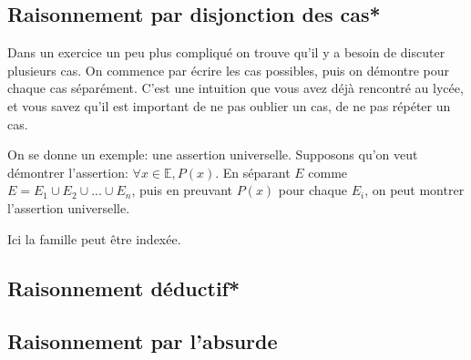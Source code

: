 \documentclass{article}
\begin{document}
\subsection{Raisonnement par disjonction des cas*}

Dans un exercice un peu plus compliqué on trouve qu'il y a besoin de discuter plusieurs cas. On commence par écrire les cas possibles, puis on démontre pour chaque cas séparément. C'est une intuition que vous avez déjà rencontré au lycée, et vous savez qu'il est important de ne pas oublier un cas, de ne pas répéter un cas.


\begin{tcolorbox}[colback=green!5!white,colframe=green!75!black,title=Point méthode 4.8]


On se donne un exemple: une assertion universelle. Supposons qu'on veut démontrer l'assertion: $\forall x \in \mathbb{E}, P(x)$. En séparant $E$ comme $E = E_1 \cup E_2 \cup ... \cup E_n$, puis en preuvant $P(x)$ pour chaque $E_i$, on peut montrer l'assertion universelle.

\tcblower

Ici la famille peut être indexée.




\end{tcolorbox}


\begin{tcolorbox}[colback=cyan!5!white,colframe=cyan!75!black,title=Exercice]


\end{tcolorbox}



\subsection{Raisonnement déductif*}

\begin{tcolorbox}[colback=green!5!white,colframe=green!75!black,title=Point méthode 4.9]


\end{tcolorbox}


\begin{tcolorbox}[colback=cyan!5!white,colframe=cyan!75!black,title=Exercice]


\end{tcolorbox}

\subsection{Raisonnement par l'absurde}
\end{document}

